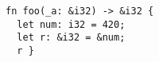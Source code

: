 \begin{lstlisting}[label=lst:lifetimes]
fn foo(_a: &i32) -> &i32 {
  let num: i32 = 420;
  let r: &i32 = &num;
  r }
\end{lstlisting}
